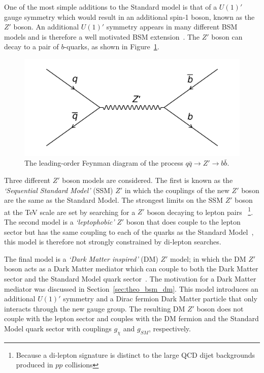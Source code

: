One of the most simple additions to the Standard model is that of a $U(1)'$ gauge symmetry
which would result in an additional spin-1 boson, known as the $Z'$ boson.
An additional $U(1)'$ symmetry appears in many different BSM models and is therefore a well motivated BSM extension~\cite{theo-bsm_zprime}.
The $Z'$ boson can decay to a pair of $b$-quarks, as shown in Figure~\ref{fig:theo-bsm_zprime}.

\begin{figure}[!hbt]
  \begin{center}
    \includegraphics[width=0.7\linewidth, angle=0]{figs/Theory/bsm_zprime.png}
  \end{center}
  \caption{The leading-order Feynman diagram of the process $q\bar{q} \to Z' \to b\bar{b}$.}
  \label{fig:theo-bsm_zprime}
\end{figure}

Three different $Z'$ boson models are considered.
The first is known as the \textit{`Sequential Standard Model'} (SSM) $Z'$ in which the couplings
of the new $Z'$ boson are the same as the Standard Model.
The strongest limits on the SSM $Z'$ boson at the TeV scale are set by searching for a $Z'$ boson decaying
to lepton pairs~\cite{theo-bsm_dilep} \footnote{Because a di-lepton signature is distinct to the large QCD dijet backgrounds produced in $pp$ collisions}.
The second model is a \textit{`leptophobic'} $Z'$ boson that does couple to the lepton sector
but has the same coupling to each of the quarks as the Standard Model~\cite{theo-bsm_zprime_leptophobic},
this model is therefore not strongly constrained by di-lepton searches.

The final model is a \textit{`Dark Matter inspired'} (DM) $Z'$ model;
in which the DM $Z'$ boson acts as a Dark Matter mediator which can couple to both the Dark Matter sector and the Standard Model quark sector~\cite{theo_bsm-zprime_dm}.
The motivation for a Dark Matter mediator was discussed in Section~\ref{sec:theo_bsm_dm}.
This model introduces an additional $U(1)'$ symmetry and a Dirac fermion Dark Matter particle that only interacts through the new gauge group.
The resulting DM $Z'$ boson does not couple with the lepton sector
and couples with the DM fermion and the Standard Model quark sector with couplings $g_\chi$\hspace{0.1mm} and $g_{SM}$\hspace{0.1mm}, respectively.

